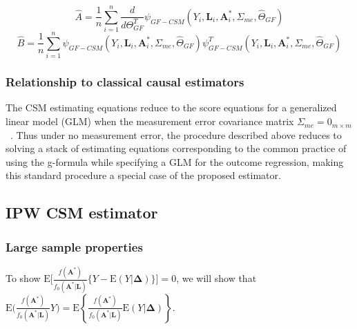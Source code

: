 \documentclass[12pt]{article}
\begin{document}
\begin{equation*}
\hat{A} = \frac{1}{n} \sum_{i=1}^{n} \frac{d}{d\Theta_{GF}^{T}} \psi_{GF-CSM}(Y_{i}, \bm{L}_{i}, \bm{A}^{*}_{i}, \Sigma_{me}, \hat{\Theta}_{GF})
\end{equation*}
\begin{equation*}
\hat{B} = \frac{1}{n} \sum_{i=1}^{n} \psi_{GF-CSM}(Y_{i}, \bm{L}_{i}, \bm{A}^{*}_{i}, \Sigma_{me}, \hat{\Theta}_{GF}) \psi^{T}_{GF-CSM}(Y_{i}, \bm{L}_{i}, \bm{A}^{*}_{i}, \Sigma_{me}, \hat{\Theta}_{GF})
\end{equation*}

\subsubsection{Relationship to classical causal estimators}

The CSM estimating equations reduce to the score equations for a generalized linear model (GLM) when the measurement error covariance matrix $\Sigma_{me} = 0_{m \times m}$~\citep{carroll2006}. Thus under no measurement error, the procedure described above reduces to solving a stack of estimating equations corresponding to the common practice of using the g-formula while specifying a GLM for the outcome regression, making this standard procedure a special case of the proposed estimator.

\subsection{IPW CSM estimator}

\subsubsection{Large sample properties}

To show $\text{E} \bigg[\frac{f(\bm{A}^{*})}{f_{0}(\bm{A}^{*} | \bm{L})} \{ Y - \text{E}(Y | \bm{\Delta})\} \bigg] = 0$, we will show that $\text{E} \bigg( \frac{f(\bm{A}^{*})}{f_{0}(\bm{A}^{*} | \bm{L})} Y \bigg) = \text{E} \left \{ \frac{f(\bm{A}^{*})}{f_{0}(\bm{A}^{*} | \bm{L})} \text{E}(Y | \bm{\Delta}) \right \}$.
\end{document}
